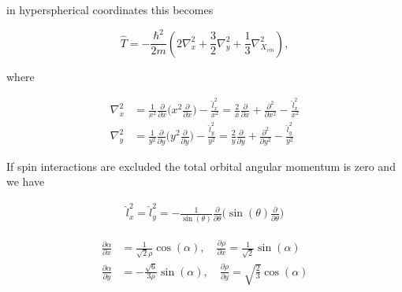 \documentclass{article}
\begin{document}
in hyperspherical coordinates this becomes 

\begin{equation}
\hat{T} = -\frac{\hbar^2}{2m}( 2\nabla^{2}_{x} + \frac{3}{2}\nabla^{2}_{y} + \frac{1}{3}\nabla^{2}_{X_{cm}} ),
\end{equation}

where

\begin{subequations}
\begin{align}
	\nabla^2_{x} &= \frac{1}{x^2}\frac{\partial}{\partial x} \Big( x^2 \frac{\partial}{\partial x} \Big) - \frac{\hat{l}^2_{x}}{x^2} = \frac{2}{x}\frac{\partial}{\partial x} + \frac{\partial^2}{\partial x^{2}} - \frac{\hat{l}^{2}_{x}}{x^2}\\
	\nabla^2_{y} &= \frac{1}{y^2}\frac{\partial}{\partial y} \Big( y^2 \frac{\partial}{\partial y} \Big) - \frac{\hat{l}^2_{y}}{y^2} = \frac{2}{y}\frac{\partial}{\partial y} + \frac{\partial^2}{\partial y^{2}} - \frac{\hat{l}^{2}_{y}}{y^2}
\end{align}
\end{subequations}

If spin interactions are excluded the total orbital angular momentum is zero and we have 

\begin{subequations}
\begin{align}
\hat{l}^{2}_{x} = \hat{l}^{2}_{y} = -\frac{1}{\sin(\theta)} \frac{\partial}{\partial{\theta}} \Big( \sin(\theta) \frac{\partial}{\partial{\theta}} \Big)
\end{align}
\end{subequations}



\begin{subequations}
\begin{align*}
        \frac{\partial \alpha}{\partial x} &= \frac{1}{\sqrt{2} \rho} \cos(\alpha), \quad \frac{\partial \rho}{\partial x} = \frac{1}{\sqrt{2}} \sin(\alpha) \\
        \frac{\partial \alpha}{\partial y} &= -\frac{\sqrt{6}}{3 \rho} \sin(\alpha), \quad \frac{\partial \rho}{\partial y} = \sqrt{\frac{2}{3}} \cos(\alpha)
\end{align*}
\end{subequations}
\end{document}
